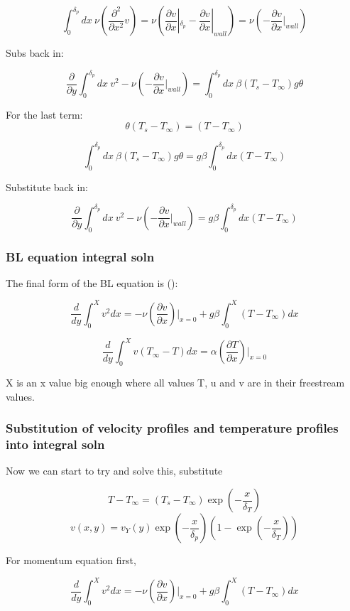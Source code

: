 \documentclass[11pt]{article}
\begin{document}
$$ \int_0^{\delta_p}  dx \ \nu ( \frac{\partial^2}{\partial x^2} v ) = \nu (\frac{\partial v}{\partial x}|_{\delta_p} - \frac{\partial v}{\partial x}|_{wall} )=\nu ( - \frac{\partial v}{\partial x}|_{wall} )$$

Subs back in:

$$ \frac{\partial}{\partial y} \int_0^{\delta_p}  dx \   v^2  - \nu ( - \frac{\partial v}{\partial x}|_{wall} ) =  \int_0^{\delta_p}  dx \ \beta(T_s-T_\infty) g \theta $$


For the last term:
$$\theta (T_s - T_\infty) = (T - T_\infty)$$

$$ \int_0^{\delta_p}  dx \ \beta(T_s-T_\infty) g \theta =g \beta \int_0^{\delta_p}  dx  (T - T_\infty)$$

Substitute back in:

$$ \frac{\partial}{\partial y} \int_0^{\delta_p}  dx \   v^2  - \nu ( - \frac{\partial v}{\partial x}|_{wall} ) =  g \beta \int_0^{\delta_p}  dx  (T - T_\infty) $$

\subsubsection{BL equation integral soln}

The final form of the BL equation is (\cite{bejan2013convection}):

$$\frac{d}{dy} \int_0^X v^2 dx = - \nu (\frac{\partial v}{\partial x})|_{x=0} + g\beta \int_0^X (T-T_\infty) dx$$

$$\frac{d}{dy} \int_0^X v (T_\infty - T) dx = \alpha (\frac{\partial T}{\partial x})|_{x=0}$$

X is an x value big enough where all values T, u and v are in their freestream values.

\subsubsection{Substitution of velocity profiles and temperature profiles into integral soln}

Now we can start to try and solve this, substitute

$$T-T_\infty = (T_s -T_\infty) \exp (-\frac{x}{\delta_T})$$
$$v (x,y) = v_Y (y) \exp (-\frac{x}{\delta_p}) (1- \exp (-\frac{x}{\delta_T}))$$


For momentum equation first,

$$\frac{d}{dy} \int_0^X v^2 dx = - \nu (\frac{\partial v}{\partial x})|_{x=0} + g\beta \int_0^X (T-T_\infty) dx$$
\end{document}
